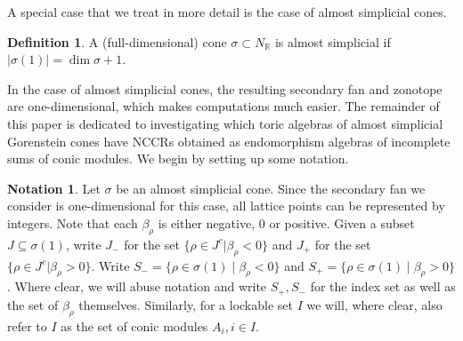 \documentclass[reqno, 12pt]{amsart}
\theoremstyle{definition}
\newtheorem{definition}[theorem]{Definition}
\newtheorem{notation}[theorem]{Notation}
\numberwithin{equation}{section}
\newcommand{\newterm}{\textsf}
\newcommand{\R}{\mathbb{R}}
\begin{document}
A special case that we treat in more detail is the case of \newterm{almost simplicial cones}.
\begin{definition}
    A (full-dimensional) cone $\sigma\subset N_\R$ is \newterm{almost simplicial} if $|\sigma(1)|=\dim \sigma+1$.
\end{definition}

In the case of almost simplicial cones, the resulting secondary fan and zonotope are one-dimensional, which makes computations much easier. 
The remainder of this paper is dedicated to investigating which toric algebras of almost simplicial Gorenstein cones have NCCRs obtained as endomorphism algebras of incomplete sums of conic modules. We begin by setting up some notation.

\begin{notation}
    \label{Not:AlmSim}
    Let $\sigma$ be an almost simplicial cone. Since the secondary fan we consider is one-dimensional for this case, all lattice points can be represented by integers. Note that each $\beta_\rho$ is either negative, 0 or positive. Given a subset $J\subseteq\sigma(1)$, write $J_-$ for the set $\{\rho\in J^c\vert \beta_\rho<0\}$ and $J_+$ for the set $\{\rho\in J^c\vert \beta_\rho>0\}$. Write $S_-=\{\rho\in \sigma(1)\mid \beta_\rho<0\}$ and $S_+=\{\rho\in \sigma(1)\mid \beta_\rho>0\}$. Where clear, we will abuse notation and write $S_+, S_-$ for the index set as well as the set of $\beta_\rho$ themselves. Similarly, for a lockable set $I$ we will, where clear, also refer to $I$ as the set of conic modules $A_i, i\in I$.
\end{notation}
\end{document}

